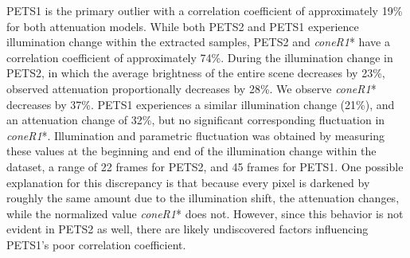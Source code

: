 PETS1 is the primary outlier with a correlation coefficient of approximately 19\% for both attenuation models. While both PETS2 and PETS1 experience illumination change within the extracted samples, PETS2 and \textit{coneR1}* have a correlation coefficient of approximately 74\%. During the illumination change in PETS2, in which the average brightness of the entire scene decreases by 23\%, observed attenuation proportionally decreases by 28\%. We observe \textit{coneR1}* decreases by 37\%. PETS1 experiences a similar illumination change (21\%), and an attenuation change of 32\%, but no significant corresponding fluctuation in \textit{coneR1}*. Illumination and parametric fluctuation was obtained by measuring these values at the beginning and end of the illumination change within the dataset, a range of 22 frames for PETS2, and 45 frames for PETS1. One possible explanation for this discrepancy is that because every pixel is darkened by roughly the same amount due to the illumination shift, the attenuation changes, while the normalized value \textit{coneR1}* does not. However, since this behavior is not evident in PETS2 as well, there are likely undiscovered factors influencing PETS1's poor correlation coefficient.



